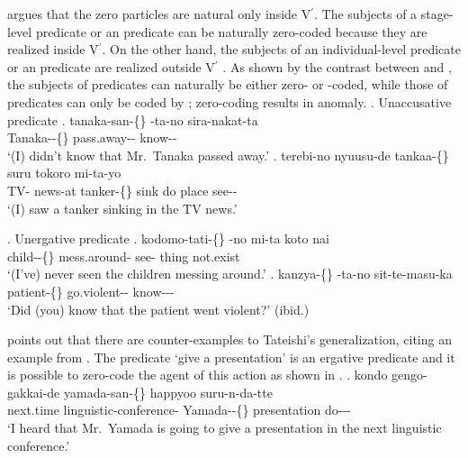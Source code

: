  argues that the zero particles are natural only inside V$^{\prime}$.
The subjects of a stage-level predicate or an  predicate can be naturally zero-coded
because they are realized inside V$^{\prime}$.
On the other hand, the subjects of an individual-level predicate or an  predicate
are realized outside V$^{\prime}$ \cite[see also][56--57]{kageyama93}.
As shown by the contrast between \Next and \NNext,
the subjects of  predicates \Next can naturally be either zero- or -coded,
while those of  predicates \NNext can only be coded by ;
zero-coding results in anomaly.
%
\ex. Unaccusative predicate
 \ag. tanaka-san-\{\} -ta-no sira-nakat-ta \\
      Tanaka--\{\} pass.away-- know-- \\
      `(I) didn't know that Mr.~Tanaka passed away.'
 \bg. terebi-no nyuusu-de tankaa-\{\}  suru tokoro mi-ta-yo \\
      TV- news-at tanker-\{\} sink do place see-- \\
      `(I) saw a tanker sinking in the TV news.'
      \hfill{\cite[56]{kageyama93}}

\ex. Unergative predicate
 \ag. kodomo-tati-\{\} -no mi-ta koto nai \\
      child--\{\} mess.around- see- thing not.exist \\
      `(I've) never seen the children messing around.'
 \bg. kanzya-\{\} -ta-no sit-te-masu-ka \\
      patient-\{\} go.violent-- know--- \\
      `Did (you) know that the patient went violent?'
      \hfill{(ibid.)}


 points out that there are counter-examples to Tateishi's generalization,
citing an example from .
The predicate  `give a presentation' is an ergative predicate and it is possible to zero-code the agent of this action
as shown in \Next.
%
\exg. kondo gengo-gakkai-de yamada-san-\{\} happyoo suru-n-da-tte \\
      next.time linguistic-conference- Yamada--\{\} presentation do--- \\
      `I heard that Mr.~Yamada is going to give a presentation in the next linguistic conference.'
      \hfill{\cite[49]{niwa89}}

